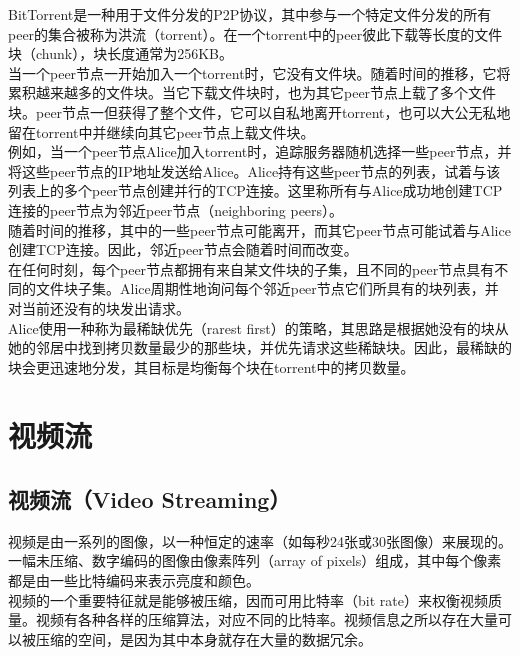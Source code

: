 BitTorrent是一种用于文件分发的P2P协议，其中参与一个特定文件分发的所有peer的集合被称为洪流（torrent）。在一个torrent中的peer彼此下载等长度的文件块（chunk），块长度通常为256KB。\\

当一个peer节点一开始加入一个torrent时，它没有文件块。随着时间的推移，它将累积越来越多的文件块。当它下载文件块时，也为其它peer节点上载了多个文件块。peer节点一但获得了整个文件，它可以自私地离开torrent，也可以大公无私地留在torrent中并继续向其它peer节点上载文件块。\\

例如，当一个peer节点Alice加入torrent时，追踪服务器随机选择一些peer节点，并将这些peer节点的IP地址发送给Alice。Alice持有这些peer节点的列表，试着与该列表上的多个peer节点创建并行的TCP连接。这里称所有与Alice成功地创建TCP连接的peer节点为邻近peer节点（neighboring peers）。\\

随着时间的推移，其中的一些peer节点可能离开，而其它peer节点可能试着与Alice创建TCP连接。因此，邻近peer节点会随着时间而改变。\\

在任何时刻，每个peer节点都拥有来自某文件块的子集，且不同的peer节点具有不同的文件块子集。Alice周期性地询问每个邻近peer节点它们所具有的块列表，并对当前还没有的块发出请求。\\

Alice使用一种称为最稀缺优先（rarest first）的策略，其思路是根据她没有的块从她的邻居中找到拷贝数量最少的那些块，并优先请求这些稀缺块。因此，最稀缺的块会更迅速地分发，其目标是均衡每个块在torrent中的拷贝数量。

\newpage

\section{视频流}

\subsection{视频流（Video Streaming）}

视频是由一系列的图像，以一种恒定的速率（如每秒24张或30张图像）来展现的。一幅未压缩、数字编码的图像由像素阵列（array of pixels）组成，其中每个像素都是由一些比特编码来表示亮度和颜色。\\

视频的一个重要特征就是能够被压缩，因而可用比特率（bit rate）来权衡视频质量。视频有各种各样的压缩算法，对应不同的比特率。视频信息之所以存在大量可以被压缩的空间，是因为其中本身就存在大量的数据冗余。\\

